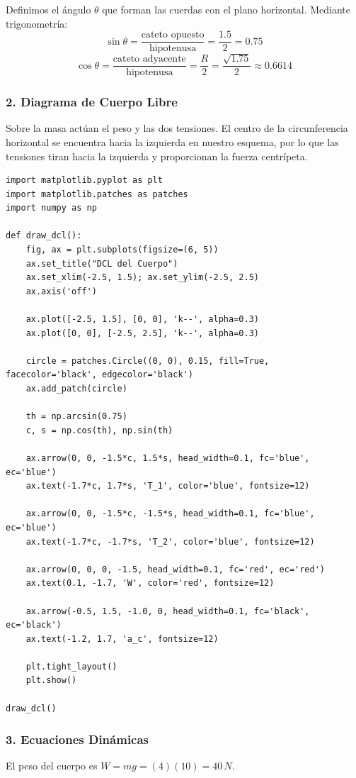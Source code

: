 \documentclass[12pt, a4paper]{article}
\begin{document}
Definimos el ángulo $\theta$ que forman las cuerdas con el plano horizontal. Mediante trigonometría:
$$ \sin\theta = \frac{\text{cateto opuesto}}{\text{hipotenusa}} = \frac{1.5}{2} = 0.75 $$
$$ \cos\theta = \frac{\text{cateto adyacente}}{\text{hipotenusa}} = \frac{R}{2} = \frac{\sqrt{1.75}}{2} \approx 0.6614 $$

\subsubsection*{2. Diagrama de Cuerpo Libre}
Sobre la masa actúan el peso y las dos tensiones. El centro de la circunferencia horizontal se encuentra hacia la izquierda en nuestro esquema, por lo que las tensiones tiran hacia la izquierda y proporcionan la fuerza centrípeta.

\begin{lstlisting}
import matplotlib.pyplot as plt
import matplotlib.patches as patches
import numpy as np

def draw_dcl():
    fig, ax = plt.subplots(figsize=(6, 5))
    ax.set_title("DCL del Cuerpo")
    ax.set_xlim(-2.5, 1.5); ax.set_ylim(-2.5, 2.5)
    ax.axis('off')

    ax.plot([-2.5, 1.5], [0, 0], 'k--', alpha=0.3)
    ax.plot([0, 0], [-2.5, 2.5], 'k--', alpha=0.3)

    circle = patches.Circle((0, 0), 0.15, fill=True, facecolor='black', edgecolor='black')
    ax.add_patch(circle)

    th = np.arcsin(0.75)
    c, s = np.cos(th), np.sin(th)

    ax.arrow(0, 0, -1.5*c, 1.5*s, head_width=0.1, fc='blue', ec='blue')
    ax.text(-1.7*c, 1.7*s, 'T_1', color='blue', fontsize=12)

    ax.arrow(0, 0, -1.5*c, -1.5*s, head_width=0.1, fc='blue', ec='blue')
    ax.text(-1.7*c, -1.7*s, 'T_2', color='blue', fontsize=12)

    ax.arrow(0, 0, 0, -1.5, head_width=0.1, fc='red', ec='red')
    ax.text(0.1, -1.7, 'W', color='red', fontsize=12)

    ax.arrow(-0.5, 1.5, -1.0, 0, head_width=0.1, fc='black', ec='black')
    ax.text(-1.2, 1.7, 'a_c', fontsize=12)

    plt.tight_layout()
    plt.show()

draw_dcl()
\end{lstlisting}

\subsubsection*{3. Ecuaciones Dinámicas}
El peso del cuerpo es $W = mg = (4)(10) = 40 \, \si{N}$.
\end{document}
